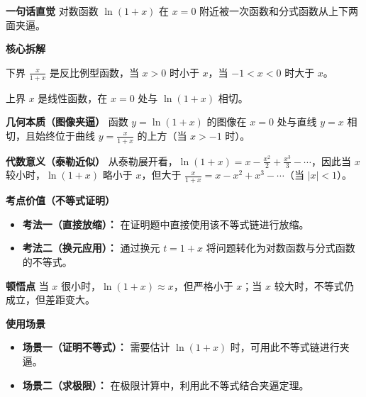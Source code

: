 \begin{explanationbox}
\textbf{\textcolor{CExplanation}{一句话直觉}}
对数函数 $\ln(1+x)$ 在 $x=0$ 附近被一次函数和分式函数从上下两面夹逼。

\medskip
\textbf{\textcolor{CExplanation}{核心拆解}}
\begin{description}[style=nextline, leftmargin=2.8em, labelsep=0.5em, itemsep=0.45em]
    \item[\textbf{要点一（下界分式）：}] 下界 $\frac{x}{1+x}$ 是反比例型函数，当 $x>0$ 时小于 $x$，当 $-1<x<0$ 时大于 $x$。
    \item[\textbf{要点二（上界线性）：}] 上界 $x$ 是线性函数，在 $x=0$ 处与 $\ln(1+x)$ 相切。
\end{description}

\medskip
\textbf{\textcolor{CExplanation}{几何本质（图像夹逼）}}
函数 $y=\ln(1+x)$ 的图像在 $x=0$ 处与直线 $y=x$ 相切，且始终位于曲线 $y=\frac{x}{1+x}$ 的上方（当 $x>-1$ 时）。

\medskip
\textbf{\textcolor{CExplanation}{代数意义（泰勒近似）}}
从泰勒展开看，$\ln(1+x) = x - \frac{x^2}{2} + \frac{x^3}{3} - \cdots$，因此当 $x$ 较小时，$\ln(1+x)$ 略小于 $x$，但大于 $\frac{x}{1+x} = x - x^2 + x^3 - \cdots$（当 $|x|<1$）。

\medskip
\textbf{\textcolor{CExplanation}{考点价值（不等式证明）}}
\begin{itemize}[leftmargin=*, itemsep=0.5em, topsep=0.4em]
    \item \textbf{考法一（直接放缩）：} 在证明题中直接使用该不等式链进行放缩。
    \item \textbf{考法二（换元应用）：} 通过换元 $t=1+x$ 将问题转化为对数函数与分式函数的不等式。
\end{itemize}

\medskip
\textbf{\textcolor{CExplanation}{顿悟点}}
当 $x$ 很小时，$\ln(1+x) \approx x$，但严格小于 $x$；当 $x$ 较大时，不等式仍成立，但差距变大。

\medskip
\textbf{\textcolor{CExplanation}{使用场景}}
\begin{itemize}[leftmargin=*, itemsep=0.5em, topsep=0.4em]
    \item \textbf{场景一（证明不等式）：} 需要估计 $\ln(1+x)$ 时，可用此不等式链进行夹逼。
    \item \textbf{场景二（求极限）：} 在极限计算中，利用此不等式结合夹逼定理。
\end{itemize}
\end{explanationbox}

